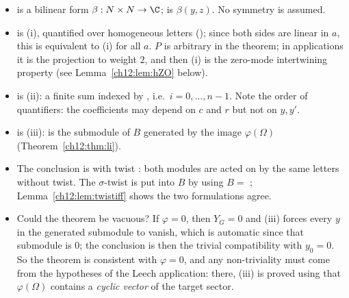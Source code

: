 \begin{dictionary}
\begin{itemize}
\item {} is a bilinear form $\beta:N\times N\to\C$;  is
  $\beta(y,z)$.  No symmetry is assumed.
\item {} is (i), quantified over homogeneous letters (); since both
  sides are linear in $a$, this is equivalent to (i) for all $a$.  $P$ is arbitrary in the theorem;
  in applications it is the projection to weight $2$, and then (i) is the zero-mode intertwining
  property (see Lemma~\ref{ch12:lem:hZO} below).
\item {} is (ii): a finite sum indexed by , i.e.\ $i=0,\dots,n-1$.
  Note the order of quantifiers: the coefficients may depend on $c$ and $r$ but not on $y,y'$.
\item {} is (iii):  is the submodule of $B$ generated by the
  image $\varphi(\Omega)$ (Theorem~\ref{ch12:thm:li}).
\item The conclusion is  with twist : both modules are acted on by the
  same letters without twist.  The $\sigma$-twist is put into $B$ by using $B=$ ;
  Lemma~\ref{ch12:lem:twistiff} shows the two formulations agree.
\item Could the theorem be vacuous?  If $\varphi=0$, then $Y_G=0$ and (iii) forces every $y$ in the
  generated submodule to vanish, which is automatic since that submodule is $0$; the conclusion is
  then the trivial compatibility with $y_0=0$.  So the theorem is consistent with $\varphi=0$, and
  any non-triviality must come from the hypotheses of the Leech application: there, (iii) is proved
  using that $\varphi(\Omega)$ contains a \emph{cyclic vector} of the target sector.
\end{itemize}
\end{dictionary}


